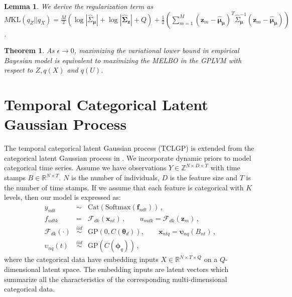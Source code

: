 \documentclass{article}
\newtheorem{lemma}{Lemma}
\newtheorem{theorem}{Theorem}
\begin{document}
\begin{lemma}
	We derive the regularization term as  $M\mathrm{KL}(q_Z || q_X) = \frac{M}{2}(\log |\hat{\Sigma}_{\bm \mu}| + \log|\hat{\bm\Sigma}_{\bm z}| + Q) + \frac{1}{2}\left(\sum_{m = 1}^M(\bm z_m - \hat{\bm \mu}_{\bm \mu})^T\hat{\Sigma}_{\bm\mu}^{-1}(\bm z_m - \hat{\bm \mu}_{\bm \mu})\right)$.
\end{lemma}

\begin{theorem}
	As $\epsilon \rightarrow 0$, maximizing the variational lower bound in empirical Bayesian model is equivalent to maximizing the MELBO in the GPLVM with respect to $Z, q(X)$ and $q(U)$.
\end{theorem}

\section{Temporal Categorical Latent Gaussian Process} \label{sec:TCLGP}

The temporal categorical latent Gaussian process (TCLGP) is extended from the categorical latent Gaussian process in \cite{Gal_2015}. We incorporate dynamic priors \citep{Lawrence_2007_HGP, Damianou_2016} to model categorical time series. Assume we have observations $Y \in \mathbb{Z}^{N\times D \times T}$ with time stamps $B \in \mathbb{R}^{N\times T}$. $N$ is the number of individuals, $D$ is the feature size and $T$ is the number of time stamps. If we assume that each feature is categorical with $K$ levels, then our model is expressed as:
\begin{eqnarray}
y_{ndt} & \sim & \mathrm{Cat}(\mathrm{Softmax}(\bm f_{ndt})) \,, \nonumber \\
f_{ndtk} & = & \mathcal{F}_{dk}(\bm x_{nt}) \,, \qquad u_{mdk} = \mathcal{F}_{dk}(\bm z_{m}) \,, \nonumber \\
\mathcal{F}_{dk}(\cdot) & \stackrel{iid}{\sim} & \mathrm{GP}(0,C(\bm \theta_d)), \qquad \bm x_{ntq} = \bm \upsilon_{nq}(B_{nt}) \,, \nonumber \\
\upsilon_{nq}(t) & \stackrel{iid}{\sim} & \mathrm{GP}(C(\bm{\phi}_q)) \nonumber \,,
\end{eqnarray}
where the categorical data have embedding inputs $X \in \mathbb{R}^{N\times T \times Q}$ on a $Q$-dimensional latent space. The embedding inputs are latent vectors which summarize all the characteristics of the corresponding multi-dimensional categorical data.
\end{document}
